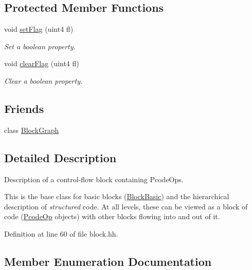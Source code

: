 \subsection*{Protected Member Functions}
\begin{DoxyCompactItemize}
\item 
void \mbox{\hyperlink{class_flow_block_a99e1437634825bce66d6eb86d8b58e34}{set\+Flag}} (uint4 fl)
\begin{DoxyCompactList}\small\item\em Set a boolean property. \end{DoxyCompactList}\item 
void \mbox{\hyperlink{class_flow_block_afd95b45dd6c78be77ad477386fe691db}{clear\+Flag}} (uint4 fl)
\begin{DoxyCompactList}\small\item\em Clear a boolean property. \end{DoxyCompactList}\end{DoxyCompactItemize}
\subsection*{Friends}
\begin{DoxyCompactItemize}
\item 
class \mbox{\hyperlink{class_flow_block_a922a06f846f258741ffe743ea49198d7}{Block\+Graph}}
\end{DoxyCompactItemize}


\subsection{Detailed Description}
Description of a control-\/flow block containing Pcode\+Ops. 

This is the base class for basic blocks (\mbox{\hyperlink{class_block_basic}{Block\+Basic}}) and the hierarchical description of {\itshape structured} code. At all levels, these can be viewed as a block of code (\mbox{\hyperlink{class_pcode_op}{Pcode\+Op}} objects) with other blocks flowing into and out of it. 

Definition at line 60 of file block.\+hh.



\subsection{Member Enumeration Documentation}
\mbox{\label{class_flow_block_a26c4544d5e03d58799f03a43a46f78d2}} 
